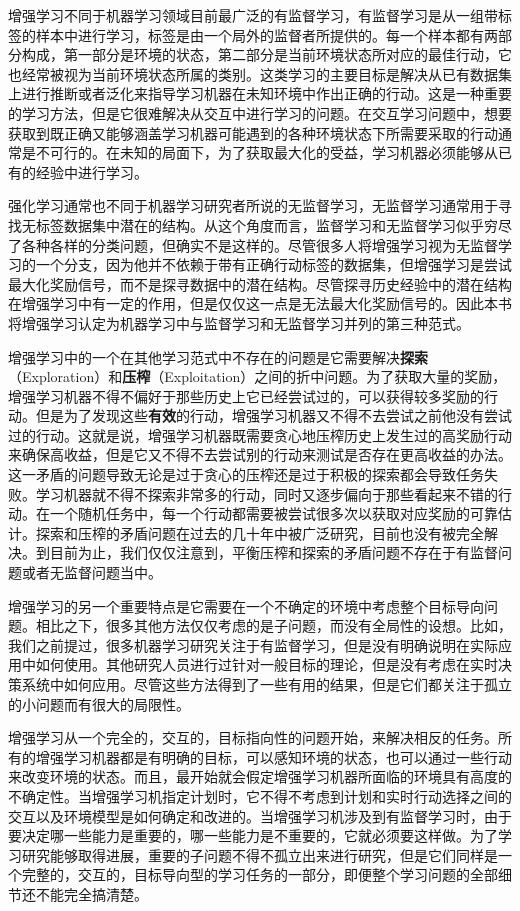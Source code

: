 \documentclass{ctexart}
\begin{document}
            增强学习不同于机器学习领域目前最广泛的有监督学习，有监督学习是从一组带标签的样本中进行学习，标签是由一个局外的监督者所提供的。每一个样本都有两部分构成，第一部分是环境的状态，第二部分是当前环境状态所对应的最佳行动，它也经常被视为当前环境状态所属的类别。这类学习的主要目标是解决从已有数据集上进行推断或者泛化来指导学习机器在未知环境中作出正确的行动。这是一种重要的学习方法，但是它很难解决从交互中进行学习的问题。在交互学习问题中，想要获取到既正确又能够涵盖学习机器可能遇到的各种环境状态下所需要采取的行动通常是不可行的。在未知的局面下，为了获取最大化的受益，学习机器必须能够从已有的经验中进行学习。

            强化学习通常也不同于机器学习研究者所说的无监督学习，无监督学习通常用于寻找无标签数据集中潜在的结构。从这个角度而言，监督学习和无监督学习似乎穷尽了各种各样的分类问题，但确实不是这样的。尽管很多人将增强学习视为无监督学习的一个分支，因为他并不依赖于带有正确行动标签的数据集，但增强学习是尝试最大化奖励信号，而不是探寻数据中的潜在结构。尽管探寻历史经验中的潜在结构在增强学习中有一定的作用，但是仅仅这一点是无法最大化奖励信号的。因此本书将增强学习认定为机器学习中与监督学习和无监督学习并列的第三种范式。

            增强学习中的一个在其他学习范式中不存在的问题是它需要解决\textbf{探索}（Exploration）和\textbf{压榨}（Exploitation）之间的折中问题。为了获取大量的奖励，增强学习机器不得不偏好于那些历史上它已经尝试过的，可以获得较多奖励的行动。但是为了发现这些\textbf{有效}的行动，增强学习机器又不得不去尝试之前他没有尝试过的行动。这就是说，增强学习机器既需要贪心地压榨历史上发生过的高奖励行动来确保高收益，但是它又不得不去尝试别的行动来测试是否存在更高收益的办法。这一矛盾的问题导致无论是过于贪心的压榨还是过于积极的探索都会导致任务失败。学习机器就不得不探索非常多的行动，同时又逐步偏向于那些看起来不错的行动。在一个随机任务中，每一个行动都需要被尝试很多次以获取对应奖励的可靠估计。探索和压榨的矛盾问题在过去的几十年中被广泛研究，目前也没有被完全解决。到目前为止，我们仅仅注意到，平衡压榨和探索的矛盾问题不存在于有监督问题或者无监督问题当中。

            增强学习的另一个重要特点是它需要在一个不确定的环境中考虑整个目标导向问题。相比之下，很多其他方法仅仅考虑的是子问题，而没有全局性的设想。比如，我们之前提过，很多机器学习研究关注于有监督学习，但是没有明确说明在实际应用中如何使用。其他研究人员进行过针对一般目标的理论，但是没有考虑在实时决策系统中如何应用。尽管这些方法得到了一些有用的结果，但是它们都关注于孤立的小问题而有很大的局限性。

            增强学习从一个完全的，交互的，目标指向性的问题开始，来解决相反的任务。所有的增强学习机器都是有明确的目标，可以感知环境的状态，也可以通过一些行动来改变环境的状态。而且，最开始就会假定增强学习机器所面临的环境具有高度的不确定性。当增强学习机指定计划时，它不得不考虑到计划和实时行动选择之间的交互以及环境模型是如何确定和改进的。当增强学习机涉及到有监督学习时，由于要决定哪一些能力是重要的，哪一些能力是不重要的，它就必须要这样做。为了学习研究能够取得进展，重要的子问题不得不孤立出来进行研究，但是它们同样是一个完整的，交互的，目标导向型的学习任务的一部分，即便整个学习问题的全部细节还不能完全搞清楚。
\end{document}
